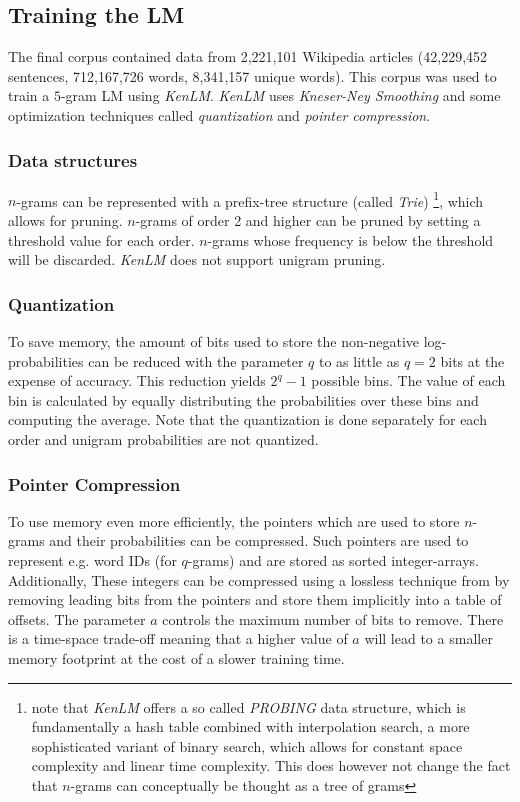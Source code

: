\subsection{Training the \ac{LM}}

The final corpus contained data from 2,221,101 Wikipedia articles (42,229,452 sentences, 712,167,726 words, 8,341,157 unique words). This corpus was used to train a $5$-gram \ac{LM} using \textit{KenLM}. \textit{KenLM} uses \textit{Kneser-Ney Smoothing} and some optimization techniques called \textit{quantization} and \textit{pointer compression}. 

\subsubsection{Data structures}
$n$-grams can be represented with a prefix-tree structure (called \textit{Trie}) \footnote{note that \textit{KenLM} offers a so called \textit{PROBING} data structure, which is fundamentally a hash table combined with interpolation search, a more sophisticated variant of binary search, which allows for constant space complexity and linear time complexity. This does however not change the fact that $n$-grams can conceptually be thought as a tree of grams}, which allows for pruning. $n$-grams of order 2 and higher can be pruned by setting a threshold value for each order. $n$-grams whose frequency is below the threshold will be discarded. \textit{KenLM} does not support unigram pruning.

\subsubsection{Quantization}
To save memory, the amount of bits used to store the non-negative log-probabilities can be reduced with the parameter $q$ to as little as $q = 2$ bits at the expense of accuracy. This reduction yields $2^q -1$ possible bins. The value of each bin is calculated by equally distributing the probabilities over these bins and computing the average. Note that the quantization is done separately for each order and unigram probabilities are not quantized.

\subsubsection{Pointer Compression}
To use memory even more efficiently, the pointers which are used to store $n$-grams and their probabilities can be compressed. Such pointers are used to represent e.g. word IDs (for $q$-grams) and are stored as sorted integer-arrays. Additionally, These integers can be compressed using a lossless technique from \cite{raj_lossless} by removing leading bits from the pointers and store them implicitly into a table of offsets. The parameter $a$ controls the maximum number of bits to remove. There is a time-space trade-off meaning that a higher value of $a$ will lead to a smaller memory footprint at the cost of a slower training time.

